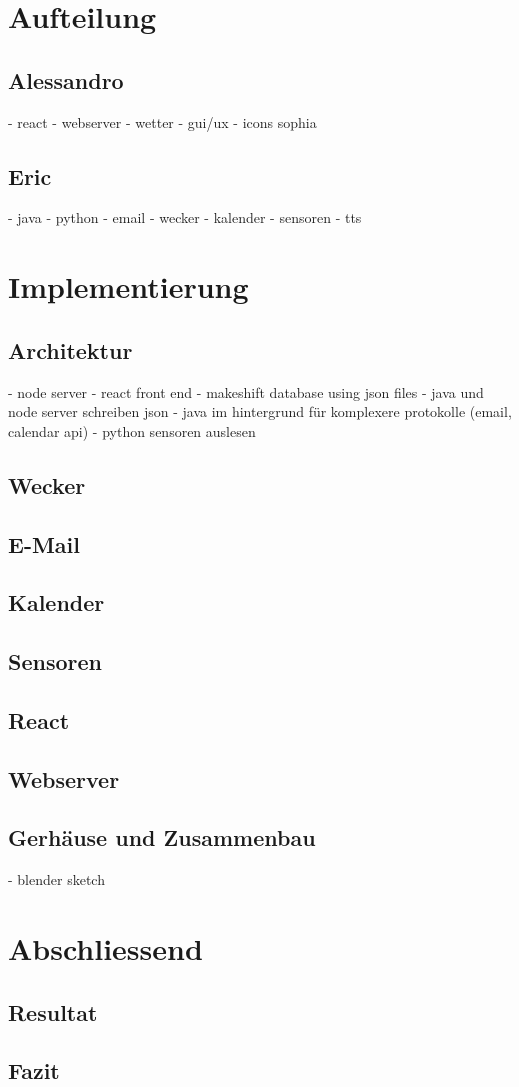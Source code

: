 \documentclass[11pt,a4paper]{article}
\begin{document}
\section{Aufteilung}
\subsection{Alessandro}
- react
- webserver
- wetter
- gui/ux
- icons sophia

\subsection{Eric}
- java
- python
- email
- wecker
- kalender
- sensoren
- tts

\section{Implementierung}
\subsection{Architektur} %
- node server
- react front end
- makeshift database using json files
- java und node server schreiben json
- java im hintergrund für komplexere protokolle (email, calendar api)
- python sensoren auslesen

\subsection{Wecker}

\subsection{E-Mail}

\subsection{Kalender}

\subsection{Sensoren}

\subsection{React}

\subsection{Webserver}

\subsection{Gerhäuse und Zusammenbau}
- blender sketch

\section{Abschliessend}
\subsection{Resultat}
\subsection{Fazit}



\end{document}
